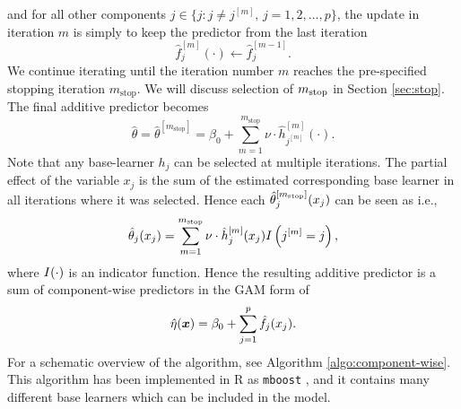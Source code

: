 and for all other components $j\in\{j\colon j\neq j^{[m]},\,j=1,2,\ldots,p\}$, the update in iteration $m$ is simply
to keep the predictor from the last iteration
\begin{equation*}
    \hat{f}_{j}^{[m]}(\cdot)\gets \hat{f}_{j}^{[m-1]}.
\end{equation*}
We continue iterating until the iteration number $m$ reaches the pre-specified stopping iteration $m_{\text{stop}}$.
We will discuss selection of $m_{\text{stop}}$ in Section \ref{sec:stop}.
The final additive predictor becomes
\begin{equation*}
    \hat{\theta}=\hat{\theta}^{[m_{\text{stop}}]}=\beta_0 + \sum_{m=1}^{m_{\text{stop}}}\nu\cdot\hat{h}_{j^{[m]}}^{[m]}(\cdot).
\end{equation*}
Note that any base-learner $h_j$ can be selected at multiple iterations.
The partial effect of the variable $x_j$ is the sum of the estimated corresponding base learner in all iterations where it was selected.
Hence each $\hat{\theta}_j^{[m_{\text{stop}}]}(x_j)$ can be seen as
i.e.,
\begin{equation*}
    \hat{\theta}_j(x_j)=\sum_{m=1}^{m_{\text{stop}}}\nu\cdot\hat{h}_j^{[m]}(x_j)I\left(j^{[m]}=j\right),
\end{equation*}
where $I(\cdot)$ is an indicator function.
Hence the resulting additive predictor is a sum of component-wise predictors in the GAM form of
\begin{equation*}
    \hat{\eta}(\bm{x})=\beta_0+\sum_{j=1}^p \hat{f}_j(x_j).
\end{equation*}
For a schematic overview of the algorithm, see Algorithm \ref{algo:component-wise}.
This algorithm has been implemented in R as \verb|mboost| \citep{mboost, mboost1, mboost2}, and it contains many different base learners which can be included in the model.

